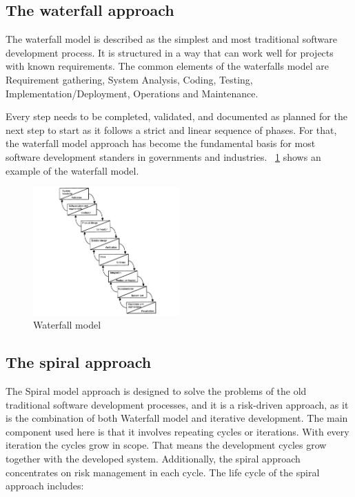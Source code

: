 \documentclass[conference,onecolumn]{IEEEtran}
\begin{document}
\subsection{The waterfall approach}
The waterfall model is described as the simplest and most traditional software development process. It is structured in a way that can work well for projects with known requirements. 
The common elements of the waterfalls model are Requirement gathering, System Analysis, Coding, Testing, Implementation/Deployment, Operations and Maintenance.

Every step needs to be completed, validated, and documented as planned for the next step to start as it follows a strict and linear sequence of phases. For that, the waterfall model approach has become the fundamental basis for most software development standers in governments and industries.
\figurename~\ref{fig:waterfall} shows an example of the waterfall model.

\begin{figure}[htb]
	\centering
	\includegraphics[width=0.5\textwidth]{Figures/XP.png}
	\caption{Waterfall model}
	\label{fig:waterfall}
\end{figure}

\subsection{The spiral approach}
The Spiral model approach is designed to solve the problems of the old traditional software development processes, and it is a risk-driven approach, as it is the combination of both Waterfall model and iterative development. The main component used here is that it involves repeating cycles or iterations.
With every iteration the cycles grow in scope. That means the development cycles grow together with the developed system.
Additionally, the spiral approach concentrates on risk management in each cycle. The life cycle of the spiral approach includes:
\end{document}
